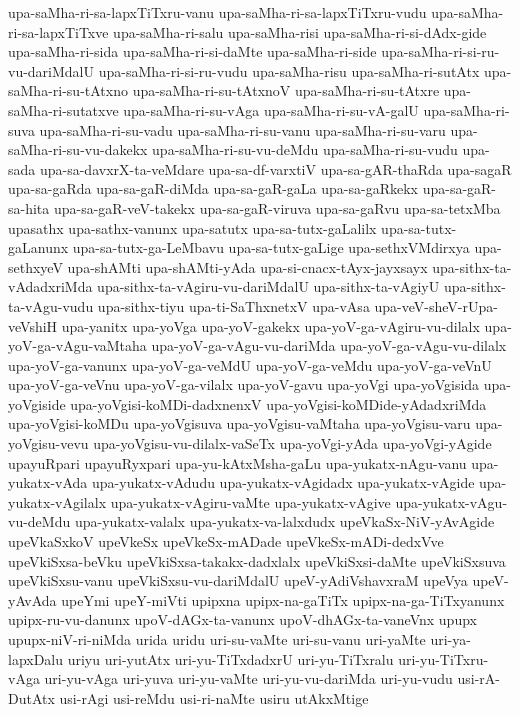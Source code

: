 {upa-saMha-ri-sa-lapxTiTxru-vanu
upa-saMha-ri-sa-lapxTiTxru-vudu
upa-saMha-ri-sa-lapxTiTxve
upa-saMha-ri-salu
upa-saMha-risi
upa-saMha-ri-si-dAdx-gide
upa-saMha-ri-sida
upa-saMha-ri-si-daMte
upa-saMha-ri-side
upa-saMha-ri-si-ru-vu-dariMdalU
upa-saMha-ri-si-ru-vudu
upa-saMha-risu
upa-saMha-ri-sutAtx
upa-saMha-ri-su-tAtxno
upa-saMha-ri-su-tAtxnoV
upa-saMha-ri-su-tAtxre
upa-saMha-ri-sutatxve
upa-saMha-ri-su-vAga
upa-saMha-ri-su-vA-galU
upa-saMha-ri-suva
upa-saMha-ri-su-vadu
upa-saMha-ri-su-vanu
upa-saMha-ri-su-varu
upa-saMha-ri-su-vu-dakekx
upa-saMha-ri-su-vu-deMdu
upa-saMha-ri-su-vudu
upa-sada
upa-sa-davxrX-ta-veMdare
upa-sa-df-varxtiV
upa-sa-gAR-thaRda
upa-sagaR
upa-sa-gaRda
upa-sa-gaR-diMda
upa-sa-gaR-gaLa
upa-sa-gaRkekx
upa-sa-gaR-sa-hita
upa-sa-gaR-veV-takekx
upa-sa-gaR-viruva
upa-sa-gaRvu
upa-sa-tetxMba
upasathx
upa-sathx-vanunx
upa-satutx
upa-sa-tutx-gaLalilx
upa-sa-tutx-gaLanunx
upa-sa-tutx-ga-LeMbavu
upa-sa-tutx-gaLige
upa-sethxVMdirxya
upa-sethxyeV
upa-shAMti
upa-shAMti-yAda
upa-si-cnacx-tAyx-jayxsayx
upa-sithx-ta-vAdadxriMda
upa-sithx-ta-vAgiru-vu-dariMdalU
upa-sithx-ta-vAgiyU
upa-sithx-ta-vAgu-vudu
upa-sithx-tiyu
upa-ti-SaThxnetxV
upa-vAsa
upa-veV-sheV-rUpa-veVshiH
upa-yanitx
upa-yoVga
upa-yoV-gakekx
upa-yoV-ga-vAgiru-vu-dilalx
upa-yoV-ga-vAgu-vaMtaha
upa-yoV-ga-vAgu-vu-dariMda
upa-yoV-ga-vAgu-vu-dilalx
upa-yoV-ga-vanunx
upa-yoV-ga-veMdU
upa-yoV-ga-veMdu
upa-yoV-ga-veVnU
upa-yoV-ga-veVnu
upa-yoV-ga-vilalx
upa-yoV-gavu
upa-yoVgi
upa-yoVgisida
upa-yoVgiside
upa-yoVgisi-koMDi-dadxnenxV
upa-yoVgisi-koMDide-yAdadxriMda
upa-yoVgisi-koMDu
upa-yoVgisuva
upa-yoVgisu-vaMtaha
upa-yoVgisu-varu
upa-yoVgisu-vevu
upa-yoVgisu-vu-dilalx-vaSeTx
upa-yoVgi-yAda
upa-yoVgi-yAgide
upayuRpari
upayuRyxpari
upa-yu-kAtxMsha-gaLu
upa-yukatx-nAgu-vanu
upa-yukatx-vAda
upa-yukatx-vAdudu
upa-yukatx-vAgidadx
upa-yukatx-vAgide
upa-yukatx-vAgilalx
upa-yukatx-vAgiru-vaMte
upa-yukatx-vAgive
upa-yukatx-vAgu-vu-deMdu
upa-yukatx-valalx
upa-yukatx-va-lalxdudx
upeVkaSx-NiV-yAvAgide
upeVkaSxkoV
upeVkeSx
upeVkeSx-mADade
upeVkeSx-mADi-dedxVve
upeVkiSxsa-beVku
upeVkiSxsa-takakx-dadxlalx
upeVkiSxsi-daMte
upeVkiSxsuva
upeVkiSxsu-vanu
upeVkiSxsu-vu-dariMdalU
upeV-yAdiVshavxraM
upeVya
upeV-yAvAda
upeYmi
upeY-miVti
upipxna
upipx-na-gaTiTx
upipx-na-ga-TiTxyanunx
upipx-ru-vu-danunx
upoV-dAGx-ta-vanunx
upoV-dhAGx-ta-vaneVnx
upupx
upupx-niV-ri-niMda
urida
uridu
uri-su-vaMte
uri-su-vanu
uri-yaMte
uri-ya-lapxDalu
uriyu
uri-yutAtx
uri-yu-TiTxdadxrU
uri-yu-TiTxralu
uri-yu-TiTxru-vAga
uri-yu-vAga
uri-yuva
uri-yu-vaMte
uri-yu-vu-dariMda
uri-yu-vudu
usi-rA-DutAtx
usi-rAgi
usi-reMdu
usi-ri-naMte
usiru
utAkxMtige
}
